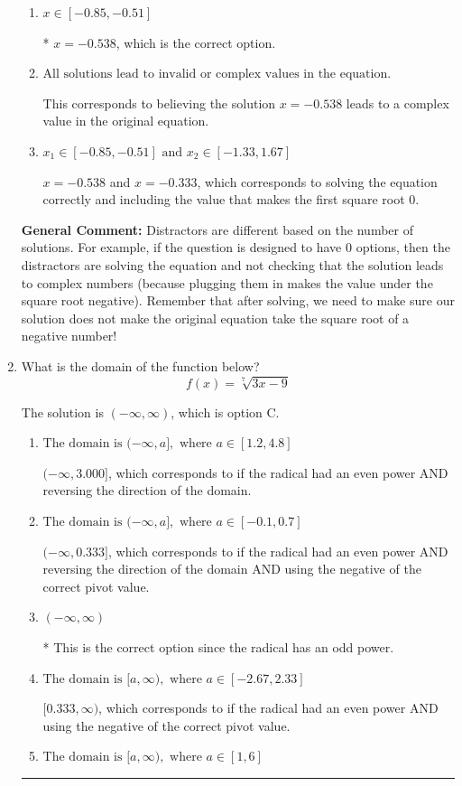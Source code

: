 \documentclass{extbook}[14pt]
\newcommand{\litem}[1]{\item #1

\rule{\textwidth}{0.4pt}}
\begin{document}
\begin{enumerate}
{\begin{enumerate}[label=\Alph*.]
$x = -1.000$ and $x = -0.333$, which corresponds to solving each radical separately for 0.
\item \( x \in [-0.85,-0.51] \)

* $x = -0.538$, which is the correct option.
\item \( \text{All solutions lead to invalid or complex values in the equation.} \)

This corresponds to believing the solution $x = -0.538$ leads to a complex value in the original equation.
\item \( x_1 \in [-0.85, -0.51] \text{ and } x_2 \in [-1.33,1.67] \)

$x = -0.538$ and $x = -0.333$, which corresponds to solving the equation correctly and including the value that makes the first square root 0.
\end{enumerate}

\textbf{General Comment:} Distractors are different based on the number of solutions. For example, if the question is designed to have 0 options, then the distractors are solving the equation and not checking that the solution leads to complex numbers (because plugging them in makes the value under the square root negative). Remember that after solving, we need to make sure our solution does not make the original equation take the square root of a negative number!
}
\litem{
What is the domain of the function below?
\[ f(x) = \sqrt[7]{3 x - 9} \]

The solution is \( (-\infty, \infty) \), which is option C.\begin{enumerate}[label=\Alph*.]
\item \( \text{The domain is } (-\infty, a], \text{   where } a \in [1.2, 4.8] \)

$(-\infty, 3.000]$, which corresponds to if the radical had an even power AND reversing the direction of the domain.
\item \( \text{The domain is } (-\infty, a], \text{   where } a \in [-0.1, 0.7] \)

$(-\infty, 0.333]$, which corresponds to if the radical had an even power AND reversing the direction of the domain AND using the negative of the correct pivot value.
\item \( (-\infty, \infty) \)

* This is the correct option since the radical has an odd power.
\item \( \text{The domain is } [a, \infty), \text{   where } a \in [-2.67, 2.33] \)

$[0.333, \infty)$, which corresponds to if the radical had an even power AND using the negative of the correct pivot value.
\item \( \text{The domain is } [a, \infty), \text{   where } a \in [1, 6] \)


\end{enumerate}}
\end{enumerate}
\end{document}
